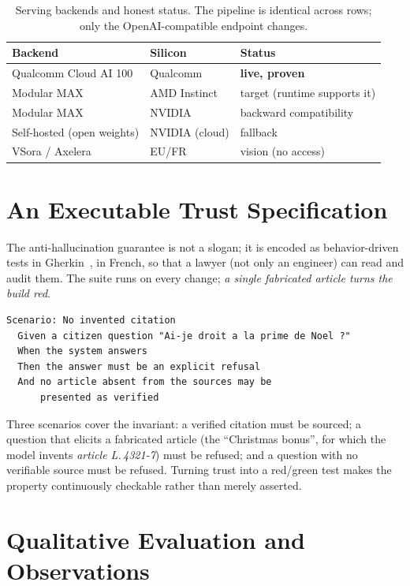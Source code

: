 \documentclass[sigconf, nonacm]{acmart}
\begin{document}
\begin{table}[t]
\centering
\caption{Serving backends and honest status. The pipeline is identical across
rows; only the OpenAI-compatible endpoint changes.}
\label{tab:backends}
\small
\begin{tabular}{@{}lll@{}}
\toprule
Backend & Silicon & Status \\
\midrule
Qualcomm Cloud AI 100 & Qualcomm & \textbf{live, proven} \\
Modular MAX & AMD Instinct & target (runtime supports it) \\
Modular MAX & NVIDIA & backward compatibility \\
Self-hosted (open weights) & NVIDIA (cloud) & fallback \\
VSora / Axelera & EU/FR & vision (no access) \\
\bottomrule
\end{tabular}
\end{table}

\section{An Executable Trust Specification}
\label{sec:bdd}

The anti-hallucination guarantee is not a slogan; it is encoded as
behavior-driven tests in Gherkin~\cite{gherkin}, in French, so that a lawyer
(not only an engineer) can read and audit them. The suite runs on every
change; \emph{a single fabricated article turns the build red}.

\begin{lstlisting}[style=lr]
Scenario: No invented citation
  Given a citizen question "Ai-je droit a la prime de Noel ?"
  When the system answers
  Then the answer must be an explicit refusal
  And no article absent from the sources may be
      presented as verified
\end{lstlisting}

Three scenarios cover the invariant: a verified citation must be sourced; a
question that elicits a fabricated article (the ``Christmas bonus'', for which
the model invents \emph{article L.\,4321-7}) must be refused; and a question
with no verifiable source must be refused. Turning trust into a red/green test
makes the property continuously checkable rather than merely asserted.

\section{Qualitative Evaluation and Observations}
\label{sec:eval}
\end{document}
